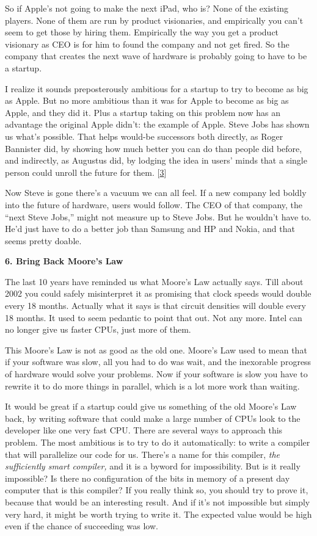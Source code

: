 So if Apple's not going to make the next iPad, who is? None of the
existing players. None of them are run by product visionaries, and
empirically you can't seem to get those by hiring them. Empirically the
way you get a product visionary as CEO is for him to found the company
and not get fired. So the company that creates the next wave of hardware
is probably going to have to be a startup.

I realize it sounds preposterously ambitious for a startup to try to
become as big as Apple. But no more ambitious than it was for Apple to
become as big as Apple, and they did it. Plus a startup taking on this
problem now has an advantage the original Apple didn't: the example of
Apple. Steve Jobs has shown us what's possible. That helps would-be
successors both directly, as Roger Bannister did, by showing how much
better you can do than people did before, and indirectly, as Augustus
did, by lodging the idea in users' minds that a single person could
unroll the future for them. {[}\hyperref[f3n]{3}{]}

Now Steve is gone there's a vacuum we can all feel. If a new company led
boldly into the future of hardware, users would follow. The CEO of that
company, the ``next Steve Jobs,'' might not measure up to Steve Jobs.
But he wouldn't have to. He'd just have to do a better job than Samsung
and HP and Nokia, and that seems pretty doable.

\textbf{6. Bring Back Moore's Law}

The last 10 years have reminded us what Moore's Law actually says. Till
about 2002 you could safely misinterpret it as promising that clock
speeds would double every 18 months. Actually what it says is that
circuit densities will double every 18 months. It used to seem pedantic
to point that out. Not any more. Intel can no longer give us faster
CPUs, just more of them.

This Moore's Law is not as good as the old one. Moore's Law used to mean
that if your software was slow, all you had to do was wait, and the
inexorable progress of hardware would solve your problems. Now if your
software is slow you have to rewrite it to do more things in parallel,
which is a lot more work than waiting.

It would be great if a startup could give us something of the old
Moore's Law back, by writing software that could make a large number of
CPUs look to the developer like one very fast CPU. There are several
ways to approach this problem. The most ambitious is to try to do it
automatically: to write a compiler that will parallelize our code for
us. There's a name for this compiler, \emph{the sufficiently smart
compiler,} and it is a byword for impossibility. But is it really
impossible? Is there no configuration of the bits in memory of a present
day computer that is this compiler? If you really think so, you should
try to prove it, because that would be an interesting result. And if
it's not impossible but simply very hard, it might be worth trying to
write it. The expected value would be high even if the chance of
succeeding was low.

